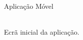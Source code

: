\begin{frame}{Aplicação Móvel}

\vspace*{-2em}

\centering
{}\\

{\small Ecrã inicial da aplicação.}

\end{frame}

